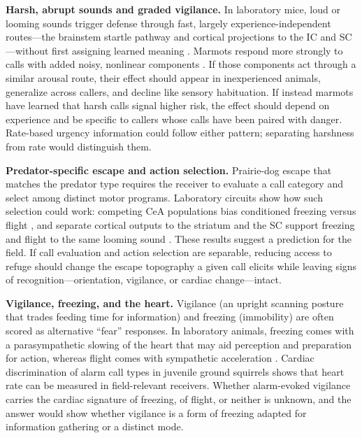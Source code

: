 \textbf{Harsh, abrupt sounds and graded vigilance.} In laboratory mice, loud or looming sounds trigger defense through fast, largely experience-independent routes---the brainstem startle pathway and cortical projections to the IC and SC---without first assigning learned meaning \citep{DavisEtAl1982,XiongEtAl2015,LiEtAl2021}. Marmots respond more strongly to calls with added noisy, nonlinear components \citep{BlumsteinRecapet2009}. If those components act through a similar arousal route, their effect should appear in inexperienced animals, generalize across callers, and decline like sensory habituation. If instead marmots have learned that harsh calls signal higher risk, the effect should depend on experience and be specific to callers whose calls have been paired with danger. Rate-based urgency information \citep{BlumsteinArmitage1997} could follow either pattern; separating harshness from rate would distinguish them.

\textbf{Predator-specific escape and action selection.} Prairie-dog escape that matches the predator type \citep{KiriazisSlobodchikoff2006} requires the receiver to evaluate a call category and select among distinct motor programs. Laboratory circuits show how such selection could work: competing CeA populations bias conditioned freezing versus flight \citep{FadokEtAl2017}, and separate cortical outputs to the striatum and the SC support freezing and flight to the same looming sound \citep{LiEtAl2021}. These results suggest a prediction for the field. If call evaluation and action selection are separable, reducing access to refuge should change the escape topography a given call elicits while leaving signs of recognition---orientation, vigilance, or cardiac change---intact.

\textbf{Vigilance, freezing, and the heart.} Vigilance (an upright scanning posture that trades feeding time for information) and freezing (immobility) are often scored as alternative ``fear'' responses. In laboratory animals, freezing comes with a parasympathetic slowing of the heart that may aid perception and preparation for action, whereas flight comes with sympathetic acceleration \citep{Roelofs2017}. Cardiac discrimination of alarm call types in juvenile ground squirrels \citep{Mateo1996} shows that heart rate can be measured in field-relevant receivers. Whether alarm-evoked vigilance carries the cardiac signature of freezing, of flight, or neither is unknown, and the answer would show whether vigilance is a form of freezing adapted for information gathering or a distinct mode.

